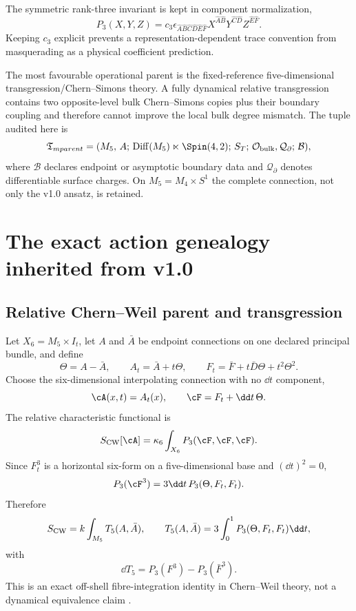 The symmetric rank-three invariant is kept in component normalization,
\[
P_3(X,Y,Z)=c_3\epsilon_{\widehat A\widehat B\widehat C\widehat D\widehat E\widehat F}
X^{\widehat A\widehat B}Y^{\widehat C\widehat D}Z^{\widehat E\widehat F}.
\]
Keeping $c_3$ explicit prevents a representation-dependent trace convention from masquerading as a physical coefficient prediction.

The most favourable operational parent is the fixed-reference five-dimensional transgression/Chern--Simons theory.  A fully dynamical relative transgression contains two opposite-level bulk Chern--Simons copies plus their boundary coupling and therefore cannot improve the local bulk degree mismatch.  The tuple audited here is
\[
\mathfrak T_{
m parent}=
(M_5,\,A;\,\operatorname{Diff}(M_5)\ltimes\Spin(4,2);\,S_T;\,
\mathcal O_{\rm bulk},\mathcal Q_{\partial};\,\mathcal B),
\]
where $\mathcal B$ declares endpoint or asymptotic boundary data and $\mathcal Q_{\partial}$ denotes differentiable surface charges.  On $M_5=M_4\times S^1$ the complete connection, not only the v1.0 ansatz, is retained.

\section{The exact action genealogy inherited from v1.0}
\label{sec:genealogy}

\subsection{Relative Chern--Weil parent and transgression}

Let $X_6=M_5\times I_t$, let $A$ and $\bar A$ be endpoint connections on one declared principal bundle, and define
\[
\Theta=A-\bar A,
\qquad
A_t=\bar A+t\Theta,
\qquad
F_t=\bar F+t\bar D\Theta+t^2\Theta^2.
\]
Choose the six-dimensional interpolating connection with no $\dd t$ component,
\[
\cA(x,t)=A_t(x),
\qquad
\cF=F_t+\dd t\,\Theta.
\]
The relative characteristic functional is
\[
S_{\rm CW}[\cA]=\kappa_6\int_{X_6}P_3(\cF,\cF,\cF).
\]
Since $F_t^3$ is a horizontal six-form on a five-dimensional base and $(\dd t)^2=0$,
\[
P_3(\cF^3)=3\dd t\,P_3(\Theta,F_t,F_t).
\]
Therefore
\[
S_{\rm CW}=k\int_{M_5}T_5(A,\bar A),
\qquad
T_5(A,\bar A)=3\int_0^1P_3(\Theta,F_t,F_t)\dd t,
\]
with
\[
\dd T_5=P_3(F^3)-P_3(\bar F^3).
\]
This is an exact off-shell fibre-integration identity in Chern--Weil theory, not a dynamical equivalence claim \citep{ChernSimons1974,MoraOleaTroncosoZanelli2006}.

